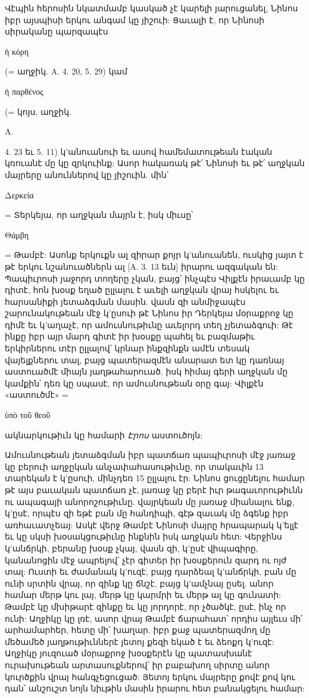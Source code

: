 \documentclass{article}
\begin{document}
{Վէպին հերոսին նկատմամբ կասկած չէ կարելի յարուցանել, Նինոս իբր այսպիսի երկու անգամ կը յիշուի: Ցաւալի է, որ Նինոսի սիրականը պարզապէս \begin{greek}ἡ κόρη\end{greek} (= աղջիկ. A. 4. 20, 5. 29) կամ \begin{greek}ἡ παρθένος\end{greek} (= կոյս, աղջիկ. \begin{greek}A.\end{greek} 4. 23 եւ 5. 11) կ'անուանուի եւ ասով համեմատութեան էական կռուանէ մը կը զրկուինք: Ասոր հակառակ թէ՛ Նինոսի եւ թէ՛ աղջկան մայրերը անուններով կը յիշուին. մին՝ \begin{greek}Δερκεία\end{greek} = Տերկեյա, որ աղջկան մայրն է, իսկ միւսը՝ \begin{greek}Θάμβη\end{greek} = Թամբէ: Ասոնք երկուքն ալ զիրար քոյր կ'անուանեն, ուսկից յայտ է թէ երկու նշանուածներն ալ [A. 3. 13 եւն] իրարու ազգական են: Պապիւրոսի յաջորդ տողերը չկան, բայց՝ ինչպէս Վիլքէն իրաւամբ կը դիտէ, հոն խօսք եղած ըլլալու է աւելի աղջկան վրայ հսկելու եւ հարսանիքի յետաձգման մասին. վասն զի անմիջապէս շարունակութեան մէջ կ'ըսուի թէ Նինոս իր Դերկեյա մօրաքրոջ կը դիմէ եւ կ'աղաչէ, որ ամուսնութիւնը աւելորդ տեղ չյետաձգուի: Թէ ինքը իբր այր մարդ գիտէ իր խօսքը պահել եւ բազմաթիւ երկիրներու տէր ըլլալով՝ կրնար ինքզինքն ամէն տեսակ վայելքներու տալ, բայց պատերազմէն անարատ ետ կը դառնայ աստուածմէ միայն յաղթահարուած. իսկ հիմայ գերի աղջկան մը կամքին՝ դեռ կը սպասէ, որ ամուսնութեան օրը գայ: Վիլքէն «աստուծմէ» = \begin{greek}ὑπὸ τοῦ θεοῦ\end{greek} ակնարկութիւն կը համարի \emph{Էրոս} աստուծոյն:

Ամուսնութեան յետաձգման իբր պատճառ պապիւրոսի մէջ յառաջ կը բերուի աղջըկան անչափահասութիւնը, որ տակաւին 13 տարեկան է կ'ըսուի, մինչդեռ 15 ըլլալու էր: Նինոս ցուցընելու համար թէ այս բաւական պատճառ չէ, յառաջ կը բերէ իւր թագաւորութիւնն ու ապագայի անորոշութիւնը. վայրկեան մը յառաջ միանալու ենք, կ'ըսէ, որպէս զի եթէ բան մը հանդիպի, գէթ զաւակ մը ձգենք իբր առհաւատչեայ: Ասկէ վերջ Թամբէ Նինոսի մայրը հրապարակ կ'ելլէ եւ կը սկսի խօսակցութիւնը ինքնին իսկ աղջկան հետ: Վերջինս կ'անճրկի, բերանը խօսք չկայ, վասն զի, կ'ըսէ վիպագիրը, կանանոցին մէջ ապրելով՝ չէր գիտեր իր խօսքերուն զարդ ու ոյժ տալ: Ուստի եւ ժամանակ կ'ուզէ, բայց դարձեալ կ'անճրկի, բան մը ունի սրտին վրայ, որ զինք կը ճնշէ, բայց կ'ամչնայ ըսել. անոր համար մերթ կու լայ, մերթ կը կարմրի եւ մերթ ալ կը գունատի: Թամբէ կը մխիթարէ զինքը եւ կը յորդորէ, որ չծածկէ, ըսէ, ինչ որ ունի: Աղջիկը կը լռէ, ասոր վրայ Թամբէ ճարահատ՝ որդիս այլեւս մի՛ արհամարհեր, հետը մի՛ խաղար. իբր քաջ պատերազմող մը մեծամեծ յաղթութիւններէ յետոյ քեզի եկած է եւ ձեոքդ կ'ուզէ: Աղջիկը յուզուած մօրաքրոջ խօսքերէն կը պատասխանէ ուրախութեան արտասուքներով՝ իր բաբախող սիրտը անոր կուրծքին վրայ հանգչեցուցած: Յետոյ երկու մայրերը քովէ քով կու դան՝ անշուշտ նոյն նիւթին մասին իրարու հետ բանակցելու համար:

}
\end{document}
